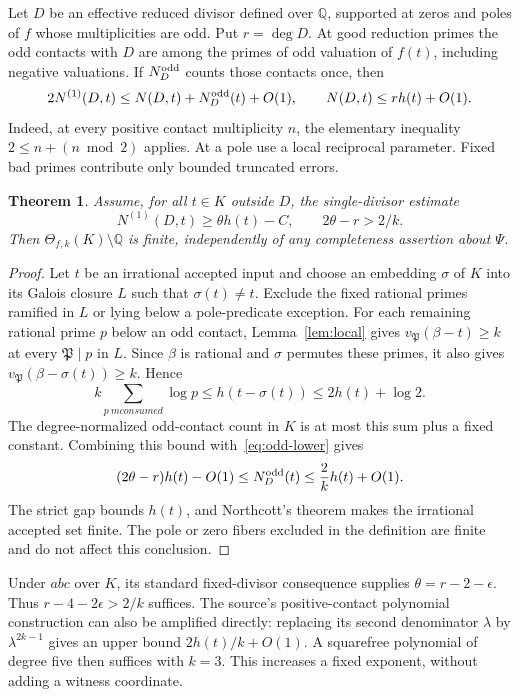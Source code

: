 \documentclass[11pt,a4paper]{article}
\newtheorem{theorem}{Theorem}[section]
\newcommand{\Q}{\mathbb Q}\newcommand{\Z}{\mathbb Z}
\begin{document}
Let $D$ be an effective reduced divisor defined over $\Q$, supported
at zeros and poles of $f$ whose multiplicities are odd. Put $r=\deg D$.
At good reduction primes the odd contacts with $D$ are among the primes
of odd valuation of $f(t)$, including negative valuations. If $N_D^{\rm odd}$
counts those contacts once, then
\begin{equation}\label{eq:odd-lower}
 2N^{(1)}(D,t)\le N(D,t)+N_D^{\rm odd}(t)+O(1),\qquad
 N(D,t)\le r h(t)+O(1).
\end{equation}
Indeed, at every positive contact multiplicity $n$, the elementary
inequality $2\le n+(n\bmod2)$ applies. At a pole use a local reciprocal
parameter. Fixed bad primes contribute only bounded truncated errors.

\begin{theorem}\label{thm:amplification}
Assume, for all $t\in K$ outside $D$, the single-divisor estimate
\[
              N^{(1)}(D,t)\ge\theta h(t)-C,
              \qquad 2\theta-r>2/k.
\]
Then $\Theta_{f,k}(K)\setminus\Q$ is finite, independently of any
completeness assertion about $\Psi$.
\end{theorem}
\begin{proof}
Let $t$ be an irrational accepted input and choose an embedding $\sigma$
of $K$ into its Galois closure $L$ such that $\sigma(t)\ne t$.
Exclude the fixed rational primes ramified in $L$ or lying below a
pole-predicate exception. For each remaining rational prime $p$ below
an odd contact, Lemma~\ref{lem:local} gives
$v_{\mathfrak P}(\beta-t)\ge k$ at every $\mathfrak P\mid p$ in $L$.
Since $\beta$ is rational and $\sigma$ permutes these primes, it also
gives $v_{\mathfrak P}(\beta-\sigma(t))\ge k$. Hence
\[
 k\sum_{p\ {
m consumed}}\log p
 \le h(t-\sigma(t))\le2h(t)+\log2.
\]
The degree-normalized odd-contact count in $K$ is at most this sum
plus a fixed constant. Combining this bound with~\eqref{eq:odd-lower}
gives
\[
 (2\theta-r)h(t)-O(1)
 \le N_D^{\rm odd}(t)
 \le\frac{2}{k}h(t)+O(1).
\]
The strict gap bounds $h(t)$, and Northcott's theorem makes the
irrational accepted set finite. The pole or zero fibers excluded in
the definition are finite and do not affect this conclusion.
\end{proof}

Under $abc$ over $K$, its standard fixed-divisor consequence supplies
$\theta=r-2-\epsilon$. Thus $r-4-2\epsilon>2/k$ suffices.
The source's positive-contact polynomial construction can also be
amplified directly: replacing its second denominator $\lambda$ by
$\lambda^{2k-1}$ gives an upper bound $2h(t)/k+O(1)$.
A squarefree polynomial of degree five then suffices with $k=3$.
This increases a fixed exponent, without adding a witness coordinate.
\end{document}
